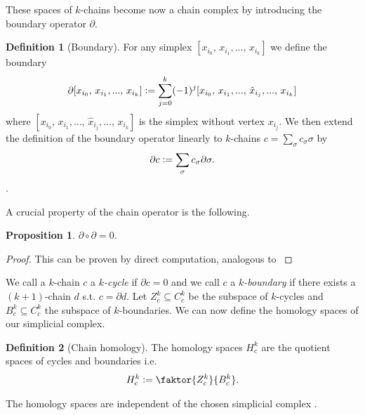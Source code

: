 \documentclass[12pt,a4paper]{article}
\newtheorem{proposition}{Proposition}
\theoremstyle{definition}
\newtheorem{definition}{Definition}
\begin{document}
These spaces of $k$-chains become now a chain complex by introducing the 
boundary operator $\partial$.

\begin{definition}[Boundary]
    For any simplex $[x_{i_0},\, x_{i_1},...,\, x_{i_k}]$ we define the boundary
    \begin{align*}
        \partial[x_{i_0},\, x_{i_1},...,\, x_{i_k}] \vcentcolon=
        \sum\limits_{j=0}^k (-1)^j [x_{i_0},\, x_{i_1},...,\, 
        \hat{x}_{i_j},...,\, x_{i_k}]
    \end{align*}
    where $[x_{i_0},\, x_{i_1},...,\, \hat{x}_{i_j},...,\, x_{i_k}]$ is the
    simplex without vertex $x_{i_j}$. We then extend the definition
    of the boundary operator linearly to $k$-chains 
    $c = \sum_\sigma c_\sigma \sigma$ by
    \begin{align*}
        \partial c \vcentcolon= \sum\limits_\sigma c_\sigma \partial \sigma.
    \end{align*}.
\end{definition}

A crucial property of the chain operator is the following.

\begin{proposition}
    $\partial \circ \partial = 0$.
\end{proposition}
\begin{proof}
    This can be proven by direct computation, analogous to 
    \cite[Chap.4, Lemma 1.6]{topology_and_geometry}
\end{proof}

We call a $k$-chain $c$ a \textit{$k$-cycle} if $\partial c = 0$ and we call $c$ 
a \textit{$k$-boundary} if there exists a $(k+1)$-chain $d$ s.t. 
$c = \partial d$. Let $Z^k_c \subseteq C^k_c$ be the subspace of $k$-cycles
and $B^k_c \subseteq C^k_c$ the subspace of $k$-boundaries.
We can now define the homology spaces of our simplicial complex.

\begin{definition}[Chain homology]
    The homology spaces $H^k_c$ are the quotient spaces of 
    cycles and boundaries i.e.
    \begin{align*}
        H^k_c\vcentcolon= \faktor{Z^k_c}{B^k_c}.
    \end{align*}
\end{definition}
\noindent The homology spaces are independent of the chosen simplicial complex
\cite{}. %
\end{document}
